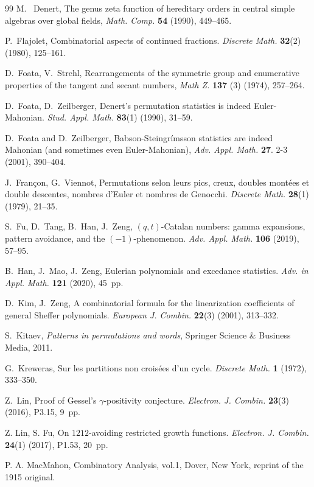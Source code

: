 \documentclass[12pt]{amsart}
\numberwithin{equation}{section}
\theoremstyle{plain}
\theoremstyle{definition}
\begin{document}
\begin{thebibliography}{99}
 M. ~Denert, The genus zeta function of hereditary orders in central simple algebras over
global fields, {\it Math. Comp.} {\bf54} (1990), 449--465.

P.~Flajolet, Combinatorial aspects of continued fractions. {\it Discrete Math.} {\bf 32}(2) (1980), 125--161.

 D.~Foata, V.~Strehl, Rearrangements of the symmetric group and enumerative properties of the tangent and secant numbers, \textit{Math Z.} {\bf137} (3) (1974), 257--264.

D.~Foata, D.~Zeilberger, Denert's permutation statistics is indeed Euler-Mahonian. {\it Stud. Appl. Math.} {\bf83}(1) (1990), 31--59.

 D.~Foata and D.~Zeilberger, Babson-Steingr\'{i}msson statistics are indeed Mahonian (and sometimes even Euler-Mahonian), {\it Adv. Appl. Math.} {\bf27}. 2-3 (2001), 390--404.

J.~Fran\c con, G.~Viennot, Permutations selon leurs pics, creux, doubles mont\'ees et double descentes, nombres d'Euler et nombres de Genocchi. {\it Discrete Math.} {\bf28}(1) (1979), 21--35.

S.~Fu, D.~Tang, B.~Han, J.~Zeng, $(q,t)$-Catalan numbers: gamma expansions, pattern avoidance, and the $(-1)$-phenomenon. {\it Adv. Appl. Math.}
{\bf 106} (2019), 57--95.

B.~Han, J.~Mao, J.~Zeng, Eulerian polynomials and excedance statistics. {\it Adv. in Appl. Math.} {\bf 121} (2020), 45~pp.

D.~Kim, J.~Zeng, A combinatorial formula for the linearization coefficients of general Sheffer polynomials. {\it European J. Combin.} {\bf 22}(3) (2001), 313--332.

S.~Kitaev, \emph{Patterns in permutations and words}, Springer Science \& Business Media, 2011.

G.~Kreweras, Sur les partitions non crois\'ees d'un cycle. {\it Discrete Math.} {\bf1} (1972), 333--350.

Z.~Lin, Proof of Gessel's $\gamma$-positivity conjecture. {\it Electron. J. Combin.} {\bf 23}(3) (2016), P3.15, 9~pp.

Z. Lin, S. Fu, On $1212$-avoiding restricted growth functions. {\it Electron. J. Combin.} {\bf 24}(1) (2017), P1.53, 20~pp.

 P. A. MacMahon, Combinatory Analysis, vol.1, Dover, New York, reprint of the 1915 original.


\end{thebibliography}
\end{document}
